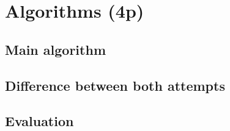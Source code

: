 \documentclass[../Main.tex]{subfiles}
\begin{document}
\section{Algorithms (4p)}
\subsection{Main algorithm}
\subsection{Difference between both attempts}
\subsection{Evaluation}
\end{document}
